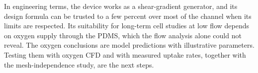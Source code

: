 In engineering terms, the device works as a shear-gradient generator, and its design formula can be trusted to a few percent over most of the channel when its limits are respected. Its suitability for long-term cell studies at low flow depends on oxygen supply through the PDMS, which the flow analysis alone could not reveal. The oxygen conclusions are model predictions with illustrative parameters. Testing them with oxygen CFD and with measured uptake rates, together with the mesh-independence study, are the next steps.
